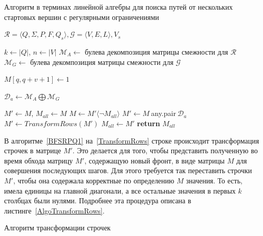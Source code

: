 \begin{algorithm}[t]
  \caption{Алгоритм в терминах линейной алгебры
    для поиска путей от нескольких стартовых
    вершин с регулярными ограничениями}\label{BFSRPQ1}
  \begin{algorithmic}[1]
     {$\mathcal{R}=\langle Q, \Sigma, P, F, Q_{s} \rangle,\mathcal{G}=\langle V, E, L \rangle, V_{s}$}

    \State $k\gets |Q|$, $n\gets |V|$
    \State $\mathcal{M}_A\gets $ булева декомпозиция матрицы смежности для $\mathcal{R}$
    \State $\mathcal{M}_G\gets $ булева декомпозиция матрицы смежности для $\mathcal{G}$

    \State $M[q,q+v+1]\gets 1$ 
    \EndFor
    \EndFor

    \State $\mathcal{D}_a\gets \mathcal{M}_A \bigoplus \mathcal{M}_G$
    \EndFor

    \State $M'\gets M$, $M_{all}\gets M$
    \State $M\gets M'\langle\neg M_{all}\rangle$
    \State $M'\gets M~$any.pair$~\mathcal{D}_a$
    \State $M'\gets TransformRows(M')$\label{TransformRows}
    \State $M_{all}\gets M'$
    \EndFor
    \EndWhile
    \State \textbf{return} $M_{all}$
    \EndProcedure
  \end{algorithmic}
\end{algorithm}

В алгоритме~\ref{BFSRPQ1} на~\ref{TransformRows} строке происходит трансформация строчек в матрице $M'$. Это делается для того, чтобы представить полученную во время обхода матрицу $M'$, содержащую новый фронт, в виде матрицы $M$ для совершения последующих шагов. Для этого требуется так переставить строчки $M'$, чтобы она содержала корректные по определению $M$ значения. То есть, имела единицы на главной диагонали, а все остальные значения в первых $k$ столбцах были нулями. Подробнее эта процедура описана в листинге~\ref{AlgoTransformRows}.

\begin{algorithm}[H]
  \caption{Алгоритм трансформации строчек}\label{AlgoTransformRows}
  \begin{algorithmic}[1]
    \EndFor
    \EndProcedure
  \end{algorithmic}
\end{algorithm}

